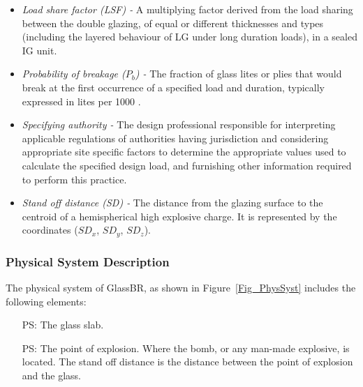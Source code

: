 \documentclass[12pt]{article}
\newcounter{physsysnum} %
\newcommand{\progname}{GlassBR}
\begin{document}
\begin{itemize}
\begin{enumerate}
\end{enumerate}

\item \textit{Load share factor (LSF) -} A multiplying factor derived from the 
load sharing between the double glazing, of equal or different thicknesses and 
types (including the layered behaviour of LG under long duration loads), in a 
sealed IG unit.   

\item \textit{Probability of breakage ($P_b$) -} The fraction of glass lites or 
plies that would break at the first occurrence of a specified load and duration, 
typically expressed in lites per 1000 \cite{ASTM2016}.

\item \textit{Specifying authority -} The design professional responsible for 
interpreting applicable regulations of authorities having jurisdiction and 
considering appropriate site specific factors to determine the appropriate 
values used to calculate the specified design load, and furnishing other 
information required to perform this practice.

\item \textit{Stand off distance (SD) -} The distance from the glazing surface to the 
centroid of a hemispherical high explosive charge. It is represented by the coordinates (${SD_{x}}$, ${SD_{y}}$, ${SD_{z}}$).

 

\end{itemize}

\subsubsection{Physical System Description}

The physical system of \progname, as shown in Figure~\ref{Fig_PhysSyst} includes
the following elements:
\begin{itemize}
	\item[PS\refstepcounter{physsysnum}\thephyssysnum:] The glass slab.
	\item[PS\refstepcounter{physsysnum}\thephyssysnum:] The point of
          explosion.  Where the bomb, or any man-made explosive,
	is located. The stand off distance is the distance between the point of
	explosion and the glass.
\end{itemize}
 
\end{document}
